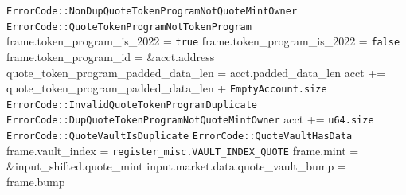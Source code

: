 \begin{algorithm}
\begin{algorithmic}
      \RETURN \texttt{ErrorCode::NonDupQuoteTokenProgramNotQuoteMintOwner}
    \ENDIF
        \RETURN \texttt{ErrorCode::QuoteTokenProgramNotTokenProgram}
      \ENDIF
      \STATE frame.token\_program\_is\_2022 = \texttt{true}
    \ELSE
      \STATE frame.token\_program\_is\_2022 = \texttt{false}
    \ENDIF
    \STATE frame.token\_program\_id = \&acct.address
    \STATE quote\_token\_program\_padded\_data\_len = acct.padded\_data\_len
    \STATE acct += quote\_token\_program\_padded\_data\_len + \texttt{EmptyAccount.size}
  \ELSE
      \RETURN \texttt{ErrorCode::InvalidQuoteTokenProgramDuplicate}
    \ENDIF
      \RETURN \texttt{ErrorCode::DupQuoteTokenProgramNotQuoteMintOwner}
    \ENDIF
    \STATE acct += \texttt{u64.size}
  \ENDIF
    \RETURN \texttt{ErrorCode::QuoteVaultIsDuplicate}
  \ENDIF
    \RETURN \texttt{ErrorCode::QuoteVaultHasData}
  \ENDIF
  \STATE frame.vault\_index = \texttt{register\_misc.VAULT\_INDEX\_QUOTE}
  \STATE frame.mint = \&input\_shifted.quote\_mint
  \STATE {}
  \STATE input.market.data.quote\_vault\_bump = frame.bump
\ENDPROCEDURE
\end{algorithmic}
\end{algorithm}
